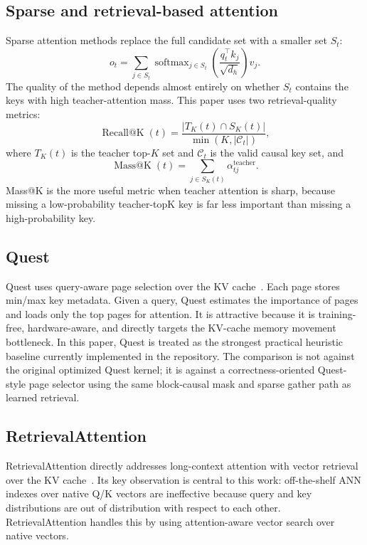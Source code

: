 \documentclass[10pt]{article}
\begin{document}
\subsection{Sparse and retrieval-based attention}
Sparse attention methods replace the full candidate set with a smaller set
$S_t$:
\begin{equation}
    o_t=\sum_{j\in S_t}\operatorname{softmax}_{j\in S_t}
    \left(\frac{q_t^\top k_j}{\sqrt{d_h}}\right)v_j.
\end{equation}
The quality of the method depends almost entirely on whether $S_t$ contains the
keys with high teacher-attention mass. This paper uses two retrieval-quality
metrics:
\begin{equation}
    \operatorname{Recall@K}(t)=\frac{|T_K(t)\cap S_K(t)|}{\min(K,|\mathcal{C}_t|)},
\end{equation}
where $T_K(t)$ is the teacher top-$K$ set and $\mathcal{C}_t$ is the valid
causal key set, and
\begin{equation}
    \operatorname{Mass@K}(t)=\sum_{j\in S_K(t)}\alpha^{\mathrm{teacher}}_{tj}.
\end{equation}
Mass@K is the more useful metric when teacher attention is sharp, because
missing a low-probability teacher-topK key is far less important than missing a
high-probability key.

\subsection{Quest}
Quest uses query-aware page selection over the KV cache~\citep{quest2024}. Each
page stores min/max key metadata. Given a query, Quest estimates the importance
of pages and loads only the top pages for attention. It is attractive because it
is training-free, hardware-aware, and directly targets the KV-cache memory
movement bottleneck. In this paper, Quest is treated as the strongest practical
heuristic baseline currently implemented in the repository. The comparison is
not against the original optimized Quest kernel; it is against a
correctness-oriented Quest-style page selector using the same block-causal mask
and sparse gather path as learned retrieval.

\subsection{RetrievalAttention}
RetrievalAttention directly addresses long-context attention with vector
retrieval over the KV cache~\citep{retrievalattention2024}. Its key observation
is central to this work: off-the-shelf ANN indexes over native Q/K vectors are
ineffective because query and key distributions are out of distribution with
respect to each other. RetrievalAttention handles this by using attention-aware
vector search over native vectors.
\end{document}

